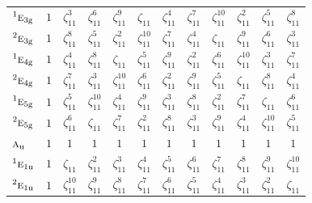 \documentclass[10pt,a4paper]{article}
\numberwithin{equation}{section}
\newcommand{\irr}[1]{\text{\normalfont\scshape #1}}
\newcommand{\conjpair}[1]{{}^{#1}}
\newcommand{\ptag}[1]{\mathrm{#1}}
\newcommand{\rootunity}[1]{\zeta_{#1}}
\begin{document}
{\begin{longtable}{@{}lccccccccccc@{}}
$\conjpair{1}\irr{e}_{3\ptag{g}}$ & $1$ & $\rootunity{11}^{3}$ & $\rootunity{11}^{6}$ & $\rootunity{11}^{9}$ & $\rootunity{11}$ & $\rootunity{11}^{4}$ & $\rootunity{11}^{7}$ & $\rootunity{11}^{10}$ & $\rootunity{11}^{2}$ & $\rootunity{11}^{5}$ & $\rootunity{11}^{8}$\\
$\conjpair{2}\irr{e}_{3\ptag{g}}$ & $1$ & $\rootunity{11}^{8}$ & $\rootunity{11}^{5}$ & $\rootunity{11}^{2}$ & $\rootunity{11}^{10}$ & $\rootunity{11}^{7}$ & $\rootunity{11}^{4}$ & $\rootunity{11}$ & $\rootunity{11}^{9}$ & $\rootunity{11}^{6}$ & $\rootunity{11}^{3}$\\
$\conjpair{1}\irr{e}_{4\ptag{g}}$ & $1$ & $\rootunity{11}^{4}$ & $\rootunity{11}^{8}$ & $\rootunity{11}$ & $\rootunity{11}^{5}$ & $\rootunity{11}^{9}$ & $\rootunity{11}^{2}$ & $\rootunity{11}^{6}$ & $\rootunity{11}^{10}$ & $\rootunity{11}^{3}$ & $\rootunity{11}^{7}$\\
$\conjpair{2}\irr{e}_{4\ptag{g}}$ & $1$ & $\rootunity{11}^{7}$ & $\rootunity{11}^{3}$ & $\rootunity{11}^{10}$ & $\rootunity{11}^{6}$ & $\rootunity{11}^{2}$ & $\rootunity{11}^{9}$ & $\rootunity{11}^{5}$ & $\rootunity{11}$ & $\rootunity{11}^{8}$ & $\rootunity{11}^{4}$\\
$\conjpair{1}\irr{e}_{5\ptag{g}}$ & $1$ & $\rootunity{11}^{5}$ & $\rootunity{11}^{10}$ & $\rootunity{11}^{4}$ & $\rootunity{11}^{9}$ & $\rootunity{11}^{3}$ & $\rootunity{11}^{8}$ & $\rootunity{11}^{2}$ & $\rootunity{11}^{7}$ & $\rootunity{11}$ & $\rootunity{11}^{6}$\\
$\conjpair{2}\irr{e}_{5\ptag{g}}$ & $1$ & $\rootunity{11}^{6}$ & $\rootunity{11}$ & $\rootunity{11}^{7}$ & $\rootunity{11}^{2}$ & $\rootunity{11}^{8}$ & $\rootunity{11}^{3}$ & $\rootunity{11}^{9}$ & $\rootunity{11}^{4}$ & $\rootunity{11}^{10}$ & $\rootunity{11}^{5}$\\
$\irr{a}_{\ptag{u}}$ & $1$ & $1$ & $1$ & $1$ & $1$ & $1$ & $1$ & $1$ & $1$ & $1$ & $1$\\
$\conjpair{1}\irr{e}_{1\ptag{u}}$ & $1$ & $\rootunity{11}$ & $\rootunity{11}^{2}$ & $\rootunity{11}^{3}$ & $\rootunity{11}^{4}$ & $\rootunity{11}^{5}$ & $\rootunity{11}^{6}$ & $\rootunity{11}^{7}$ & $\rootunity{11}^{8}$ & $\rootunity{11}^{9}$ & $\rootunity{11}^{10}$\\
$\conjpair{2}\irr{e}_{1\ptag{u}}$ & $1$ & $\rootunity{11}^{10}$ & $\rootunity{11}^{9}$ & $\rootunity{11}^{8}$ & $\rootunity{11}^{7}$ & $\rootunity{11}^{6}$ & $\rootunity{11}^{5}$ & $\rootunity{11}^{4}$ & $\rootunity{11}^{3}$ & $\rootunity{11}^{2}$ & $\rootunity{11}$\\

\end{longtable}}
\end{document}
